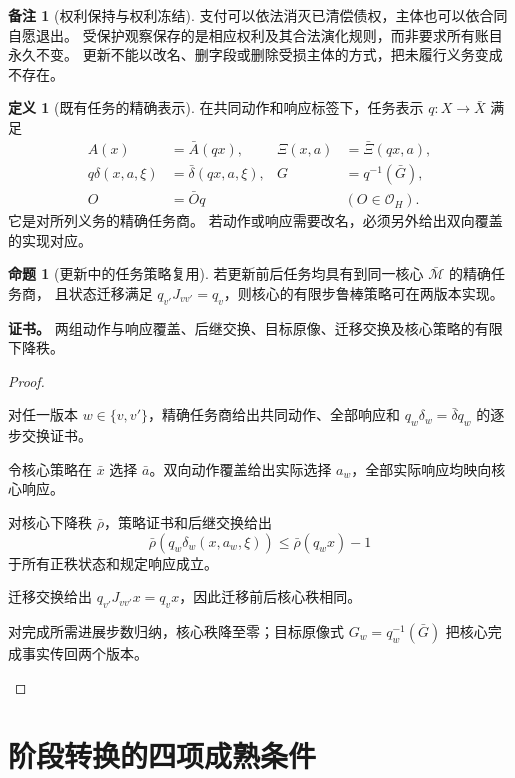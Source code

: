 \documentclass[UTF8,12pt,a4paper,openany,fontset=none,zihao=false]{ctexrep}
\theoremstyle{definition}
\newtheorem{definition}{定义}[chapter]
\newtheorem{proposition}{命题}[chapter]
\newtheorem{remark}{备注}[chapter]
\newenvironment{certificate}{\par\noindent\textbf{证书。}\ignorespaces}{\par}
\newcommand{\1}{\mathbf 1}
\begin{document}
\begin{remark}[权利保持与权利冻结]
支付可以依法消灭已清偿债权，主体也可以依合同自愿退出。
受保护观察保存的是相应权利及其合法演化规则，而非要求所有账目永久不变。
更新不能以改名、删字段或删除受损主体的方式，把未履行义务变成不存在。
\end{remark}

\begin{definition}[既有任务的精确表示]
在共同动作和响应标签下，任务表示 \(q:X\to\bar X\) 满足
\[
\begin{aligned}
A(x)&=\bar A(qx),&\Xi(x,a)&=\bar\Xi(qx,a),\\
q\delta(x,a,\xi)&=\bar\delta(qx,a,\xi),&G&=q^{-1}(\bar G),\\
O&=\bar Oq&& (O\in\mathcal O_H).
\end{aligned}
\]
它是对所列义务的精确任务商。
若动作或响应需要改名，必须另外给出双向覆盖的实现对应\cite{InternalTheory}。
\end{definition}

\begin{proposition}[更新中的任务策略复用]
\label{tra:reuse}
若更新前后任务均具有到同一核心 \(\bar{\mathcal M}\) 的精确任务商，
且状态迁移满足 \(q_{v'}J_{vv'}=q_v\)，则核心的有限步鲁棒策略可在两版本实现。
\end{proposition}
\begin{certificate}
两组动作与响应覆盖、后继交换、目标原像、迁移交换及核心策略的有限下降秩。
\end{certificate}
\begin{proof}
\begin{semanticsteps}
\item 对任一版本 \(w\in\{v,v'\}\)，精确任务商给出共同动作、全部响应和
\(q_w\delta_w=\bar\delta q_w\) 的逐步交换证书。
\item 令核心策略在 \(\bar x\) 选择 \(\bar a\)。双向动作覆盖给出实际选择 \(a_w\)，全部实际响应均映向核心响应。
\item 对核心下降秩 \(\bar\rho\)，策略证书和后继交换给出
\[
\bar\rho(q_w\delta_w(x,a_w,\xi))
\le\bar\rho(q_wx)-1
\]
于所有正秩状态和规定响应成立。
\item 迁移交换给出
\(q_{v'}J_{vv'}x=q_vx\)，因此迁移前后核心秩相同。
\item 对完成所需进展步数归纳，核心秩降至零；目标原像式
\(G_w=q_w^{-1}(\bar G)\) 把核心完成事实传回两个版本。
\end{semanticsteps}
\end{proof}

\section{阶段转换的四项成熟条件}
\end{document}
